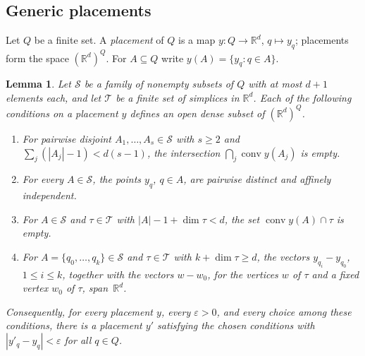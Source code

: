 \documentclass[11pt]{article}
\newtheorem{lemma}[theorem]{Lemma}
\theoremstyle{definition}
\numberwithin{equation}{section}
\newcommand{\R}{\mathbb R}
\DeclareMathOperator{\conv}{conv}
\begin{document}
\subsection{Generic placements}

Let $Q$ be a finite set. A \emph{placement} of $Q$ is a map $y:Q\to\R^d$, $q\mapsto y_q$; placements form the space $(\R^d)^Q$. For $A\subseteq Q$ write $y(A)=\{y_q:q\in A\}$.

\begin{lemma}\label{lem:generic}
Let $\mathcal S$ be a family of nonempty subsets of $Q$ with at most $d+1$ elements each, and let $\mathcal T$ be a finite set of simplices in $\R^d$. Each of the following conditions on a placement $y$ defines an open dense subset of $(\R^d)^Q$.
\begin{enumerate}[label=\textup{(G\arabic*)}]
\item\label{G:sgp} For pairwise disjoint $A_1,\ldots,A_s\in\mathcal S$ with $s\ge2$ and $\sum_j(|A_j|-1)<d(s-1)$, the intersection $\bigcap_j\conv y(A_j)$ is empty.
\item\label{G:ind} For every $A\in\mathcal S$, the points $y_q$, $q\in A$, are pairwise distinct and affinely independent.
\item\label{G:empty} For $A\in\mathcal S$ and $\tau\in\mathcal T$ with $|A|-1+\dim\tau<d$, the set $\conv y(A)\cap\tau$ is empty.
\item\label{G:span} For $A=\{q_0,\ldots,q_k\}\in\mathcal S$ and $\tau\in\mathcal T$ with $k+\dim\tau\ge d$, the vectors $y_{q_i}-y_{q_0}$, $1\le i\le k$, together with the vectors $w-w_0$, for the vertices $w$ of $\tau$ and a fixed vertex $w_0$ of $\tau$, span~$\R^d$.
\end{enumerate}
Consequently, for every placement $y$, every $\varepsilon>0$, and every choice among these conditions, there is a placement $y'$ satisfying the chosen conditions with $|y'_q-y_q|<\varepsilon$ for all $q\in Q$.
\end{lemma}
\end{document}
